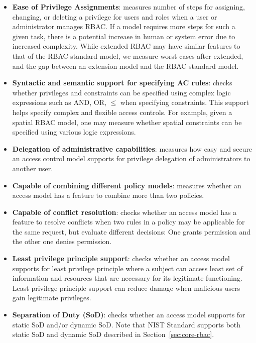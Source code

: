 \begin{itemize}
	\item \textbf{Ease of Privilege Assignments}: measures number of steps for assigning, changing, or deleting a privilege for users and roles when a user or administrator manages RBAC. If a model requires more steps for such a given task, there is a potential increase in human or system error due to increased complexity. While extended RBAC may have similar features to that of the RBAC standard model, we measure worst cases after extended, and the gap between an extension model and the RBAC standard model.
	
	\item \textbf{Syntactic and semantic support for specifying AC rules}: checks whether privileges and constraints can be specified using complex logic expressions such as AND, OR, $\leq$ when specifying constraints. This support helps specify complex and flexible access controls. For example, given a spatial RBAC model, one may measure whether spatial constraints can be specified using various logic expressions.

	\item \textbf{Delegation of administrative capabilities}: measures how easy and secure an access control model supports for privilege delegation of administrators to another user.

	\item \textbf{Capable of combining different policy models}: measures whether an access model has a feature to combine more than two policies.

	\item \textbf{Capable of conflict resolution}: checks whether an access model has a feature to resolve conflicts when two rules in a policy may be applicable for the same request, but evaluate different decisions: One grants permission and the other one denies permission.

	\item \textbf{Least privilege principle support}: checks whether an access model supports for least privilege principle where a subject can access least set of information and resources that are necessary for its legitimate functioning. Least privilege principle support can reduce damage when malicious users gain legitimate privileges.

	\item \textbf{Separation of Duty (SoD)}: checks whether an access model supports for static SoD and/or dynamic SoD. Note that NIST Standard supports both static SoD and dynamic SoD described in Section~\ref{sec:core-rbac}.
\end{itemize}

